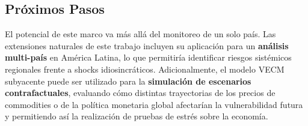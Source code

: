 \documentclass[11pt,a4paper]{article}
\numberwithin{equation}{section}
\begin{document}
\subsection*{Próximos Pasos}
El potencial de este marco va más allá del monitoreo de un solo país. Las extensiones naturales de este trabajo incluyen su aplicación para un \textbf{análisis multi-país} en América Latina, lo que permitiría identificar riesgos sistémicos regionales frente a shocks idiosincráticos. Adicionalmente, el modelo VECM subyacente puede ser utilizado para la \textbf{simulación de escenarios contrafactuales}, evaluando cómo distintas trayectorias de los precios de commodities o de la política monetaria global afectarían la vulnerabilidad futura y permitiendo así la realización de pruebas de estrés sobre la economía.
\printbibliography
\end{document}
